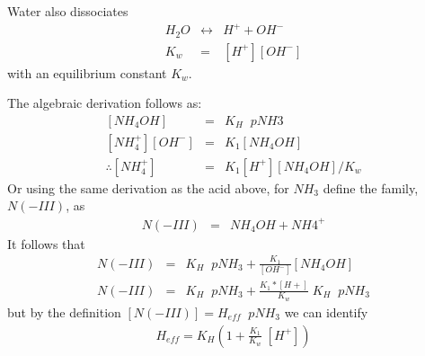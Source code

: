\documentclass[11pt, oneside]{article}   	%
\begin{document}
Water also dissociates
\begin{eqnarray*}
H_2O &\leftrightarrow& H^+  + OH^- \\
K_w &=& \left[H^+\right]\left[OH^-\right]
\end{eqnarray*}
with an equilibrium constant $K_w$. 

The algebraic derivation follows as:
\begin{eqnarray*}
\left[ NH_4OH \right] &=& K_H \;\; pNH3 \\
\left[NH_4^+\right] \left[ OH^- \right] &=& K_1 \left[ NH_4OH \right] \\
\therefore \left[ NH_4^+ \right] &=& K_1 \left[ H^+ \right] \left[ NH_4OH \right ]/ K_w 
\end{eqnarray*}
Or using the same derivation as the acid above, for $NH_3$ define the family, $N(-III)$, as 
\begin{eqnarray*}
N(-III) &=& NH_4OH + NH4^+ 
\end{eqnarray*}
It follows that 
\begin{eqnarray*}
N(-III) &=& K_H \;\; pNH_3 + \frac{K_1  }{ \left[OH^-\right]} \left[ NH_4OH \right]\\
N(-III) &=& K_H \;\; pNH_3 + \frac{K_1*\left[H+\right]}{K_w} \; K_H \;\; pNH_3  
\end{eqnarray*}
but by the definition $\left[N(-III)\right] = H_{eff} \; \;pNH_3$ we can identify
\begin{eqnarray*}
H_{eff} = K_H  \left(1 + \frac{K_1 }{K_w}\;\left[H^+\right]\right)
\end{eqnarray*}
\end{document}
